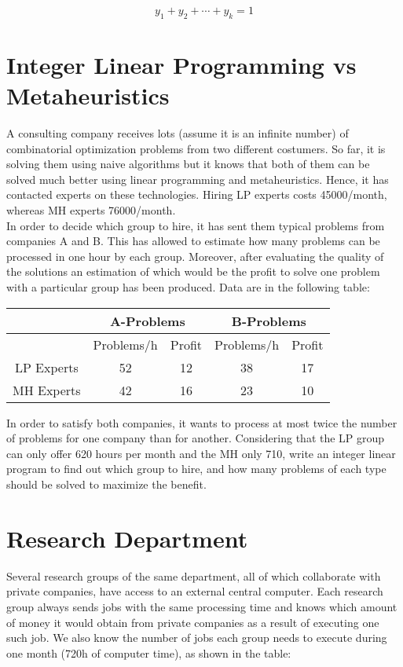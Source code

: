 \documentclass[11pt, oneside]{article}   	%
\begin{document}
$$y_1 + y_2 + \cdots + y_k = 1$$

\section{Integer Linear Programming vs Metaheuristics}

A consulting company receives lots (assume it is an infinite number) of combinatorial optimization problems from two different costumers. So far, it is solving them using naive algorithms but it knows that both of them can be solved much better using linear programming and metaheuristics. Hence, it has contacted experts on these technologies. Hiring LP experts costs 45000/month, whereas MH experts 76000/month.\\

In order to decide which group to hire, it has sent them typical problems from companies A and B. This has allowed to estimate how many problems can be processed in one hour by each group. Moreover, after evaluating the quality of the solutions an estimation of which would be the profit to solve one problem with a particular group has been produced. Data are in the following table:

\begin{center}
\begin{tabular}{ |c|c|c|c|c| } 
 \hline
  & \multicolumn{2}{|c|}{A-Problems}  & \multicolumn{2}{|c|}{B-Problems}\\ 
  \hline
  & Problems/h & Profit & Problems/h & Profit \\ 
  \hline
 LP Experts & 52 & 12 & 38 & 17 \\ 
 \hline
 MH Experts & 42 & 16 & 23 & 10 \\ 
 \hline
\end{tabular}
\end{center}

In order to satisfy both companies, it wants to process at most twice the number of problems for one company than for another. Considering that the LP group can only offer 620 hours per month and the MH only 710, write an integer linear program to find out which group to hire, and how many problems of each type should be solved to maximize the benefit.\\

\section{Research Department}

Several research groups of the same department, all of which collaborate with private companies, have access to an external central computer. Each research group always sends jobs with the same processing time and knows which amount of money it would obtain from private companies as a result of executing one such job. We also know the number of jobs each group needs to execute during one month (720h of computer time), as shown in the table:
\end{document}
